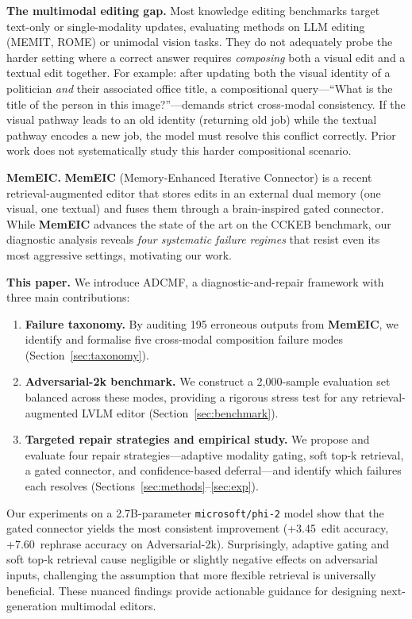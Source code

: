 \documentclass[11pt]{article}
\newcommand{\memeic}{\textbf{MemEIC}}
\newcommand{\adcmf}{\textsc{ADCMF}}
\newcommand{\pp}{\,\text{pp}}
\begin{document}
\textbf{The multimodal editing gap.} Most knowledge editing benchmarks target
text-only or single-modality updates, evaluating methods on LLM editing
(MEMIT, ROME) or unimodal vision tasks. They do not adequately probe the
harder setting where a correct answer requires \emph{composing} both a visual
edit and a textual edit together. For example: after updating both the visual
identity of a politician \emph{and} their associated office title, a
compositional query---``What is the title of the person in this image?''---demands
strict cross-modal consistency. If the visual pathway leads to an old identity
(returning old job) while the textual pathway encodes a new job, the model must
resolve this conflict correctly. Prior work does not systematically study this
harder compositional scenario.

\textbf{MemEIC.} \memeic{} (Memory-Enhanced Iterative Connector) is a recent
retrieval-augmented editor that stores edits in an external dual memory (one
visual, one textual) and fuses them through a brain-inspired gated connector.
While \memeic{} advances the state of the art on the CCKEB benchmark, our
diagnostic analysis reveals \emph{four systematic failure regimes} that resist
even its most aggressive settings, motivating our work.

\textbf{This paper.} We introduce \adcmf{}, a diagnostic-and-repair framework
with three main contributions:

\begin{enumerate}[leftmargin=*,itemsep=2pt]
  \item \textbf{Failure taxonomy.} By auditing 195 erroneous outputs from
    \memeic{}, we identify and formalise five cross-modal composition failure
    modes (Section~\ref{sec:taxonomy}).
  
  \item \textbf{Adversarial-2k benchmark.} We construct a 2{,}000-sample
    evaluation set balanced across these modes, providing a rigorous stress test
    for any retrieval-augmented LVLM editor (Section~\ref{sec:benchmark}).
  
  \item \textbf{Targeted repair strategies and empirical study.} We propose and
    evaluate four repair strategies---adaptive modality gating, soft top-k
    retrieval, a gated connector, and confidence-based deferral---and identify
    which failures each resolves (Sections~\ref{sec:methods}--\ref{sec:exp}).
\end{enumerate}

Our experiments on a 2.7B-parameter \texttt{microsoft/phi-2} model show that
the gated connector yields the most consistent improvement (+3.45\pp{} edit
accuracy, +7.60\pp{} rephrase accuracy on Adversarial-2k). Surprisingly,
adaptive gating and soft top-k retrieval cause negligible or slightly negative
effects on adversarial inputs, challenging the assumption that more flexible
retrieval is universally beneficial. These nuanced findings provide actionable
guidance for designing next-generation multimodal editors.
\end{document}
